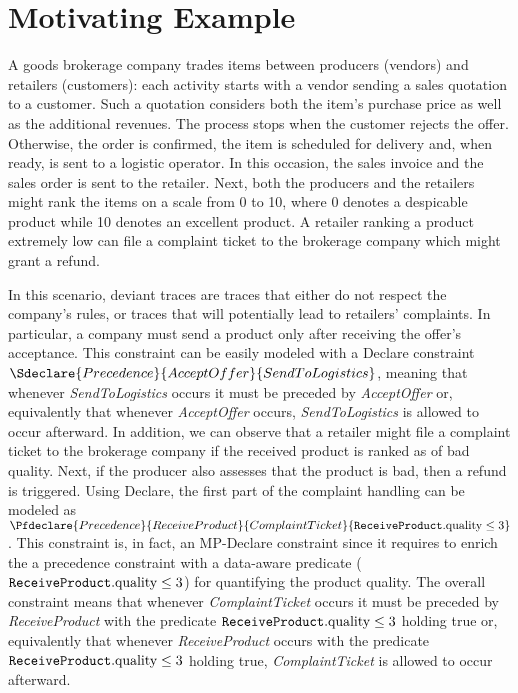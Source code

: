 \section{Motivating Example}\label{sec:mot}
A goods brokerage company \cite{PetermannJMR14} trades items between producers (vendors) and retailers (customers): each activity starts with a vendor sending a sales quotation to a customer. Such a quotation considers both the item's purchase price as well as the additional revenues. The process stops when the customer rejects the offer. Otherwise, the order is confirmed, the item is scheduled for delivery and, when ready, is sent to a logistic operator. In this occasion, the sales invoice and the sales order is sent to the retailer. Next, both the producers and the retailers might rank the items on a scale from 0 to 10, where 0 denotes a despicable product while 10 denotes an excellent product. A retailer ranking a product extremely low can file a complaint ticket to the brokerage company which might grant a refund.

In this scenario, deviant traces are traces that either do not respect the company's rules, or traces that will potentially lead to retailers' complaints. In particular, a company must send a product only after receiving the offer's acceptance. This constraint can be easily modeled with a Declare constraint $\Sdeclare{Precedence}{AcceptOffer}{SendToLogistics}$, meaning that whenever \emph{SendToLogistics} occurs it must be preceded by \emph{AcceptOffer} or, equivalently that whenever \emph{AcceptOffer} occurs, \emph{SendToLogistics} is allowed to occur afterward. In addition, we can observe that a retailer might file a complaint ticket to the brokerage company if the received product is ranked as of bad quality. Next, if the producer also assesses that the product is bad, then a refund is triggered. Using Declare, the first part of the complaint handling can be modeled as $\Pfdeclare{Precedence}{ReceiveProduct}{ComplaintTicket}{\texttt{ReceiveProduct}.\textup{quality}\leq 3}$. This constraint is, in fact, an MP-Declare constraint since it requires to enrich the a precedence constraint with a data-aware predicate ($\texttt{ReceiveProduct}.\textup{quality}\leq 3$) for quantifying the product quality. The overall constraint means that whenever \emph{ComplaintTicket} occurs it must be preceded by \emph{ReceiveProduct} with the predicate $\texttt{ReceiveProduct}.\textup{quality}\leq 3$ holding true or, equivalently that whenever \emph{ReceiveProduct} occurs with the predicate $\texttt{ReceiveProduct}.\textup{quality}\leq 3$ holding true, \emph{ComplaintTicket} is allowed to occur afterward.


